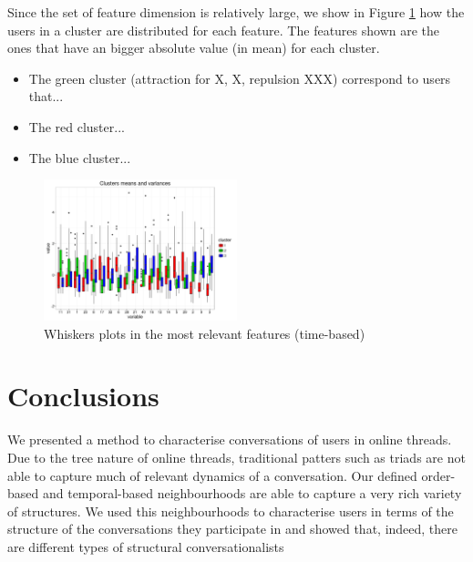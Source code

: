 \documentclass[conference]{IEEEtran}
\begin{document}
Since the set of feature dimension is relatively large, we show in Figure \ref{fig:whiskers} how the users in a cluster are distributed for each feature. The features shown are the ones that have an bigger absolute value (in mean) for each cluster.

\begin{itemize}
\item The green cluster (attraction for X, X, repulsion XXX) correspond to users that...
\item The red cluster...
\item The blue cluster...
\end{itemize}

\begin{figure}
	\centering
	\includegraphics[width=0.5\textwidth]{whiskers}
	\caption{Whiskers plots in the most relevant features (time-based)}
	\label{fig:whiskers}
\end{figure}









\section{Conclusions}
We presented a method to characterise conversations of users in online threads. Due to the tree nature of online threads, traditional patters such as triads are not able to capture much of relevant dynamics of a conversation. Our defined order-based and temporal-based neighbourhoods 
are able to capture a very rich variety of structures. We used this neighbourhoods to characterise users in terms of the structure of the conversations they participate in and showed that, indeed, there are different types of structural conversationalists
\end{document}

